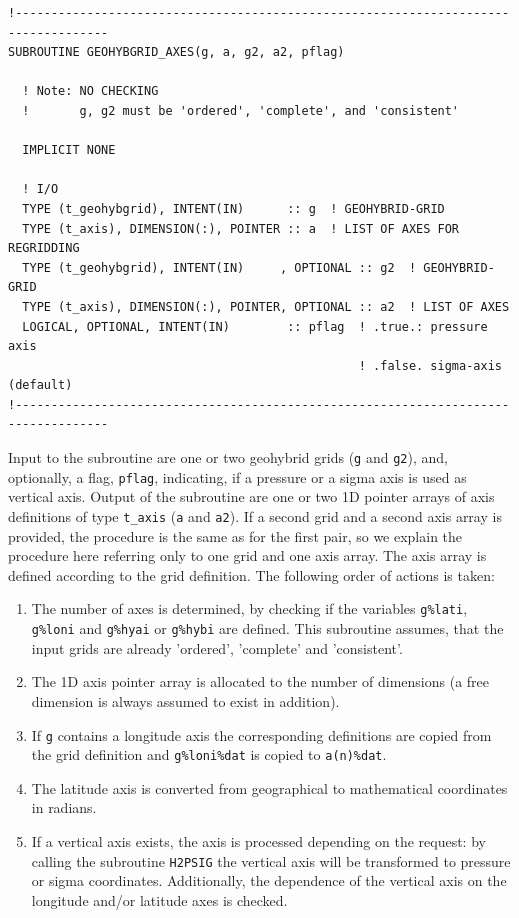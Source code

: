 \documentclass[11pt,twoside]{article}
\begin{document}
\begin{verbatim}
!-----------------------------------------------------------------------------------
SUBROUTINE GEOHYBGRID_AXES(g, a, g2, a2, pflag)

  ! Note: NO CHECKING
  !       g, g2 must be 'ordered', 'complete', and 'consistent'

  IMPLICIT NONE

  ! I/O
  TYPE (t_geohybgrid), INTENT(IN)      :: g  ! GEOHYBRID-GRID
  TYPE (t_axis), DIMENSION(:), POINTER :: a  ! LIST OF AXES FOR REGRIDDING
  TYPE (t_geohybgrid), INTENT(IN)     , OPTIONAL :: g2  ! GEOHYBRID-GRID
  TYPE (t_axis), DIMENSION(:), POINTER, OPTIONAL :: a2  ! LIST OF AXES
  LOGICAL, OPTIONAL, INTENT(IN)        :: pflag  ! .true.: pressure axis
                                                 ! .false. sigma-axis (default)
!-----------------------------------------------------------------------------------
\end{verbatim}
Input to the subroutine are one or two geohybrid grids (\verb|g|
and \verb|g2|), and, optionally, a flag, \verb|pflag|, indicating, if a
pressure or a sigma axis is used as 
vertical axis.  Output of the subroutine are one or two 1D pointer 
arrays of axis definitions of type \verb|t_axis| (\verb|a| and \verb|a2|).
If a second grid and a second axis array is provided, the procedure is the same
as for the first pair, so we explain the procedure here referring only to one
grid and one axis array.
The axis array is defined according to the grid definition. The following
order of actions is taken:
\begin{enumerate}
\item The number of axes is determined, by checking if the
variables \verb|g%lati|, \verb|g%loni| and \verb|g%hyai|
or \verb|g%hybi| are 
defined. This subroutine assumes, that the input grids are already
'ordered', 'complete' and 'consistent'. 
\item The 1D axis pointer array is allocated to the number of dimensions
(a free dimension is always assumed to exist in addition).
\item If \verb|g| contains a longitude axis the corresponding 
definitions are copied from the grid definition and \verb|g%loni%dat| is
copied to \verb|a(n)%dat|. 
\item The latitude axis is converted from geographical to mathematical
coordinates in radians.
\item If a vertical axis exists, the axis is processed depending on the
request: by calling the subroutine \verb|H2PSIG| the vertical axis
will be transformed to pressure or sigma coordinates. Additionally, the 
dependence of the vertical axis on the longitude and/or latitude axes
is checked.
\end{enumerate}
  
\end{document}
